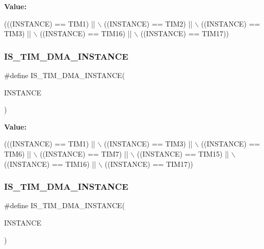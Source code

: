 {\bfseries Value\+:}
\begin{DoxyCode}
(((INSTANCE) == TIM1)    || \(\backslash\)
   ((INSTANCE) == TIM2)    || \(\backslash\)
   ((INSTANCE) == TIM3)    || \(\backslash\)
   ((INSTANCE) == TIM16)   || \(\backslash\)
   ((INSTANCE) == TIM17))
\end{DoxyCode}
\mbox{\label{group___exported__macro_gad51d77b3bcc12a3a5c308d727b561371}} 
\subsubsection{\texorpdfstring{I\+S\+\_\+\+T\+I\+M\+\_\+\+D\+M\+A\+\_\+\+I\+N\+S\+T\+A\+N\+CE}{IS\_TIM\_DMA\_INSTANCE}\hspace{0.1cm}{\footnotesize\ttfamily [6/16]}}
{\footnotesize\ttfamily \#define I\+S\+\_\+\+T\+I\+M\+\_\+\+D\+M\+A\+\_\+\+I\+N\+S\+T\+A\+N\+CE(\begin{DoxyParamCaption}\item[{}]{I\+N\+S\+T\+A\+N\+CE }\end{DoxyParamCaption})}

{\bfseries Value\+:}
\begin{DoxyCode}
(((INSTANCE) == TIM1)    || \(\backslash\)
   ((INSTANCE) == TIM3)    || \(\backslash\)
   ((INSTANCE) == TIM6)    || \(\backslash\)
   ((INSTANCE) == TIM7)    || \(\backslash\)
   ((INSTANCE) == TIM15)   || \(\backslash\)
   ((INSTANCE) == TIM16)   || \(\backslash\)
   ((INSTANCE) == TIM17))
\end{DoxyCode}
\mbox{\label{group___exported__macro_gad51d77b3bcc12a3a5c308d727b561371}} 
\subsubsection{\texorpdfstring{I\+S\+\_\+\+T\+I\+M\+\_\+\+D\+M\+A\+\_\+\+I\+N\+S\+T\+A\+N\+CE}{IS\_TIM\_DMA\_INSTANCE}\hspace{0.1cm}{\footnotesize\ttfamily [7/16]}}
{\footnotesize\ttfamily \#define I\+S\+\_\+\+T\+I\+M\+\_\+\+D\+M\+A\+\_\+\+I\+N\+S\+T\+A\+N\+CE(\begin{DoxyParamCaption}\item[{}]{I\+N\+S\+T\+A\+N\+CE }\end{DoxyParamCaption})}

